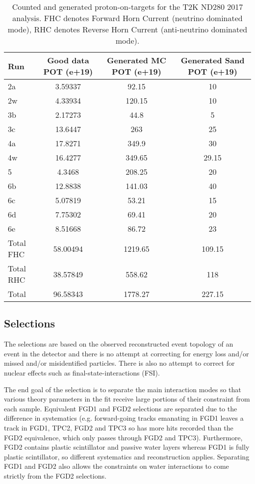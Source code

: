 \begin{table}[htbp]
	\centering
	\begin{tabular}{ l c c c }
		\hline
                Run & Good data POT (e+19) & Generated MC POT (e+19) & Generated Sand POT (e+19) \\
		\hline
		\hline
		2a  & 3.59337    & 92.15       & 10 \\
		2w  & 4.33934    & 120.15      & 10 \\
		\hline
		3b  & 2.17273    & 44.8        & 5 \\
		3c  & 13.6447    & 263         & 25 \\
		\hline
		4a  & 17.8271    & 349.9       & 30 \\
		4w  & 16.4277    & 349.65      & 29.15 \\
		\hline
		5   & 4.3468     & 208.25      & 20 \\
		\hline
		6b  & 12.8838    & 141.03      & 40 \\
		6c  & 5.07819    & 53.21       & 15 \\
		6d  & 7.75302    & 69.41       & 20 \\
		6e  & 8.51668    & 86.72       & 23 \\
		\hline
		Total FHC & 58.00494 & 1219.65 & 109.15\\
		Total RHC & 38.57849 & 558.62  & 118 \\
		Total & 96.58343 & 1778.27 & 227.15 \\
		\hline
	\end{tabular}
	\caption{Counted and generated proton-on-targets for the T2K ND280 2017 analysis. FHC denotes Forward Horn Current (neutrino dominated mode), RHC denotes Reverse Horn Current (anti-neutrino dominated mode).}
	\label{tab:pot_2017}
\end{table}

\subsection{Selections}
\label{subsec:ND280:sel}
The selections are based on the observed reconstructed event topology of an event in the detector and there is no attempt at correcting for energy loss and/or missed and/or misidentified particles. There is also no attempt to correct for nuclear effects such as final-state-interactions (FSI).

The end goal of the selection is to separate the main interaction modes so that various theory parameters in the fit receive large portions of their constraint from each sample. Equivalent FGD1 and FGD2 selections are separated due to the difference in systematics (e.g. forward-going tracks emanating in FGD1 leaves a track in FGD1, TPC2, FGD2 and TPC3 so has more hits recorded than the FGD2 equivalence, which only passes through FGD2 and TPC3). Furthermore, FGD2 contains plastic scintillator and passive water layers whereas FGD1 is fully plastic scintillator, so different systematics and reconstruction applies. Separating FGD1 and FGD2 also allows the constraints on water interactions to come strictly from the FGD2 selections.

